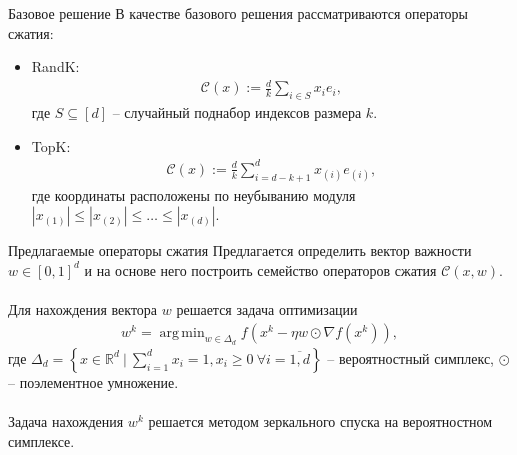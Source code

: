 \documentclass{beamer}
\DeclareMathOperator*{\argmin}{arg\,min}
\begin{document}

\begin{frame}{Базовое решение}
    В качестве базового решения рассматриваются операторы сжатия:
    \begin{itemize}
     \item RandK:
     \begin{align*}
      \mathcal{C}(x) := \frac{d}{k} \sum_{i \in S} x_i e_i,
     \end{align*}
     где $S \subseteq [d]$ -- случайный поднабор индексов размера $k$.
     \item TopK:
     \begin{align*}
      \mathcal{C}(x) := \frac{d}{k} \sum_{i = d - k + 1}^d x_{(i)} e_{(i)},
     \end{align*}
     где координаты расположены по неубыванию модуля $|x_{(1)}| \leq |x_{(2)}| \leq \dots \leq |x_{(d)}|$.
    \end{itemize}

\end{frame}


\begin{frame}{Предлагаемые операторы сжатия}
    Предлагается определить вектор важности $w \in [0, 1]^d$ и на основе  него построить семейство операторов сжатия $\mathcal{C}(x, w)$.\\
    $ $\\
    Для нахождения вектора $w$ решается задача оптимизации
    \begin{align*}
     w^k = \argmin_{w \in \Delta_d} f(x^k - \eta w \odot \nabla f(x^k)),
    \end{align*}
    где $\Delta_d = \left\{x \in \mathbb{R}^d ~|~ \sum\limits_{i = 1}^d x_i = 1, x_i \geq 0 ~ \forall i = \overline{1, d}\right\}$ -- вероятностный симплекс, $\odot$ -- поэлементное умножение.\\
    $ $\\
    Задача нахождения $w^k$ решается методом зеркального спуска на вероятностном симплексе.
\end{frame}

\end{document}
